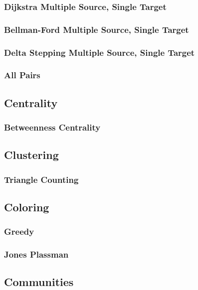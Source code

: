 \subsubsection{Dijkstra Multiple Source, Single Target}
\subsubsection{Bellman-Ford Multiple Source, Single Target}
\subsubsection{Delta Stepping Multiple Source, Single Target}

\subsubsection{All Pairs}

\subsection{Centrality}
\subsubsection{Betweenness Centrality}

\subsection{Clustering}
\subsubsection{Triangle Counting}

\subsection{Coloring}
\subsubsection{Greedy}
\subsubsection{Jones Plassman}

\subsection{Communities}

